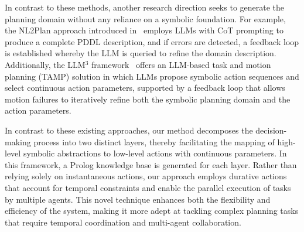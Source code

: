 In contrast to these methods, another research direction seeks to generate the planning domain without any reliance on a symbolic foundation. For example, the NL2Plan approach introduced in~\cite{gestrin2024towards} employs LLMs with CoT prompting to produce a complete PDDL description, and if errors are detected, a feedback loop is established whereby the LLM is queried to refine the domain description.
Additionally, the LLM$^3$ framework~\cite{wang2024llm3largelanguagemodelbasedtask} offers an LLM-based task and motion planning (TAMP) solution in which LLMs propose symbolic action sequences and select continuous action parameters, supported by a feedback loop that allows motion failures to iteratively refine both the symbolic planning domain and the action parameters.

In contrast to these existing approaches, our method decomposes the decision-making process into two distinct layers, thereby facilitating the mapping of high-level symbolic abstractions to low-level actions with continuous parameters. In this framework, a Prolog knowledge base is generated for each layer. Rather than relying solely on instantaneous actions, our approach employs durative actions that account for temporal constraints and enable the parallel execution of tasks by multiple agents. 
This novel technique enhances both the flexibility and efficiency of the system, making it more adept at tackling complex planning tasks that require temporal coordination and multi-agent collaboration.




